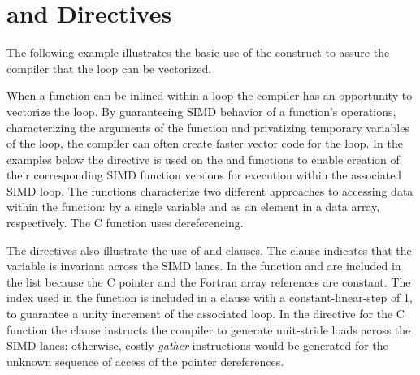\section{ and  Directives}
\label{sec:SIMD}

The following example illustrates the basic use of the  construct 
to assure the compiler that the loop can be vectorized.


 

When a function can be inlined within a loop the compiler has an opportunity to 
vectorize the loop. By guaranteeing SIMD behavior of a function's operations, 
characterizing the arguments of the function and privatizing temporary 
variables of the loop, the compiler can often create faster vector code for 
the loop. In the examples below the  directive is 
used on the  and  functions to enable creation of their 
corresponding SIMD function versions for execution within the associated SIMD 
loop. The functions characterize two different approaches to accessing data 
within the function: by a single variable and as an element in a data array, 
respectively. The  C function uses dereferencing.

The  directives also illustrate the use of 
 and  clauses.  The  clause 
indicates that the variable  is invariant across the SIMD lanes. In 
the  function  and  are included in the  
list because the C pointer and the Fortran array references are constant.  The 
 index used in the  function is included in a  
clause with a constant-linear-step of 1, to guarantee a unity increment of the 
associated loop. In the  directive for the  
C function the   clause instructs the compiler to generate 
unit-stride loads across the SIMD lanes; otherwise,  costly \emph{gather} 
instructions would be generated for the unknown sequence of access of the 
pointer dereferences.

